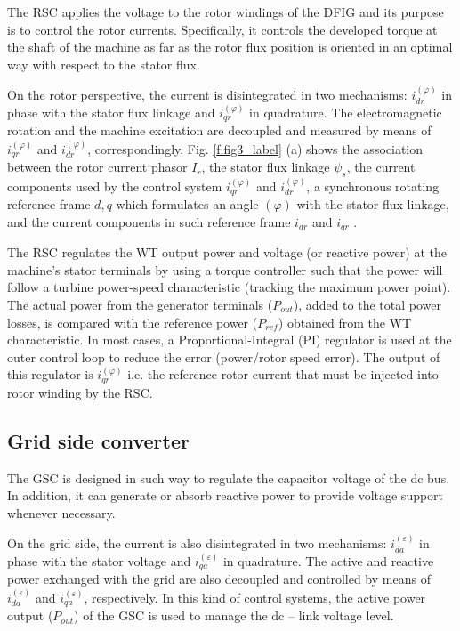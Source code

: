 \documentclass[conference,11pt]{IEEEtran}
\begin{document}
The RSC applies the voltage to the rotor windings of the DFIG and its purpose is to control the rotor currents. Specifically, it controls the developed torque at the shaft of the machine as far as the rotor flux position is oriented in an optimal way with respect to the stator flux.
 
On the rotor perspective, the current is disintegrated in two mechanisms: $i_{dr}^{(\varphi)}$ in phase with the stator flux linkage and $i_{qr}^{(\varphi)}$ in quadrature. The electromagnetic rotation and the machine excitation are decoupled and measured by means of $i_{qr}^{(\varphi)}$ and $i_{dr}^{(\varphi)}$, correspondingly. Fig. \ref{f:fig3_label} (a) shows the association between the rotor current phasor $I_r$, the stator flux linkage $\psi_s$, the current components used by the control system $i_{qr}^{(\varphi)}$ and $i_{dr}^{(\varphi)}$, a synchronous rotating reference frame ${d,q}$ which formulates an angle $(\varphi)$ with the stator flux linkage, and the current components in such reference frame $i_{dr}$ and $i_{qr}$ \cite{ref10}.

The RSC regulates the WT output power and voltage (or reactive power) at the machine's stator terminals by using a torque controller such that the power will follow a turbine power-speed characteristic (tracking the maximum power point). The actual power from the generator terminals ($P_{out}$),  added to the total power losses, is compared with the reference power ($P_{ref}$) obtained from the WT characteristic. In most cases, a Proportional-Integral (PI) regulator is used at the outer control loop to reduce the error (power/rotor speed error). The output of this regulator is $i_{qr}^{(\varphi)}$ i.e. the reference rotor current that must be injected into rotor winding by the RSC. 

\subsection{Grid side converter}

The GSC is designed in such way to regulate the capacitor voltage of the dc bus. In addition, it can generate or absorb reactive power to provide voltage support whenever necessary. 

On the grid side, the current is also disintegrated in two mechanisms: $i_{da}^{(\varepsilon)}$ in phase with the stator voltage and $i_{qa}^{(\varepsilon)}$ in quadrature. The active and reactive power exchanged with the grid are also decoupled and controlled by means of $i_{da}^{(\varepsilon)}$ and $i_{qa}^{(\varepsilon)}$, respectively. In this kind of control systems, the active power output ($P_{out}$) of the GSC is used to manage the dc – link voltage level. 
\end{document}
